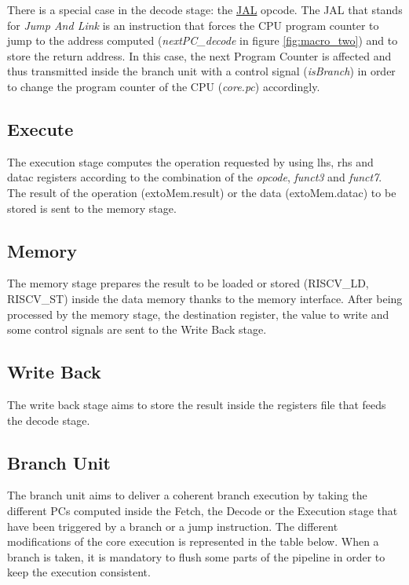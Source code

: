 \documentclass[10pt,letterpaper]{article}
\begin{document}
There is a special case in the decode stage: the \underline{JAL} opcode. The JAL that stands for \textit{Jump And Link} is an instruction that forces the CPU program counter to jump to the address computed (\textit{nextPC\_decode} in figure \ref{fig:macro_two}) and to store the return address. In this case, the next Program Counter is affected and thus transmitted inside the branch unit with a control signal (\textit{isBranch}) in order to change the program counter of the CPU (\textit{core.pc}) accordingly.

\newpage

\subsection{Execute}

The execution stage computes the operation requested by using lhs, rhs and datac registers according to the combination of the \textit{opcode}, \textit{funct3} and \textit{funct7}. The result of the operation (extoMem.result) or the data (extoMem.datac) to be stored is sent to the memory stage. 

\subsection{Memory}

The memory stage prepares the result to be loaded or stored (RISCV\_LD, RISCV\_ST) inside the data memory thanks to the memory interface. After being processed by the memory stage, the destination register, the value to write and some control signals are sent to the Write Back stage.

\subsection{Write Back}

The write back stage aims to store the result inside the registers file that feeds the decode stage.

\subsection{Branch Unit}

The branch unit aims to deliver a coherent branch execution by taking the different PCs computed inside the Fetch, the Decode or the Execution stage that have been triggered by a branch or a jump instruction. The different modifications of the core execution is represented in the table below. When a branch is taken, it is mandatory to flush some parts of the pipeline in order to keep the execution consistent.
\end{document}
